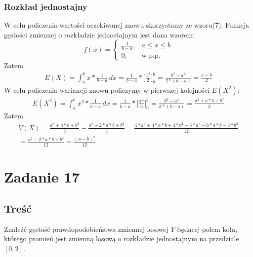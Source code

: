 \documentclass[10pt, a4paper]{article}
\begin{document}
\subsubsection*{Rozkład jednostajny}
W celu policzenia wartości oczekiwanej znowu skorzystamy ze wzoru(7). Funkcja gęstości zmiennej o rozkładzie jednostajnym jest dana wzorem:
\begin{equation}
f(x) = \begin{cases}
       \frac{1}{b-a}, & a \leq x \leq b\\
        0, & \text{w\ p.p.}
  		\end{cases}
\end{equation}
Zatem
\begin{align*}
E(X) = \int_{a}^{b} x * \frac{1}{b-a} \,dx = \frac{1}{b-a} * \Big[ \frac{x^2}{2}\Big]_a^{b} = \frac{b^2 - a^2}{2 * (b - a)} = \frac{a + b}{2}
\end{align*}
W celu policzenia wariancji znowu policzymy w pierwszej kolejności $E(X^2)$:
\begin{align*}
E(X^2) = \int_{a}^{b} x^2 * \frac{1}{b-a} \,dx = \frac{1}{b-a} * \Big[ \frac{x^3}{3}\Big]_a^{b} = \frac{b^3 - a^3}{3 * (b - a)} = \frac{a^2 + a * b + b^2}{3}
\end{align*}
Zatem
\begin{align*}
V(X) = \frac{a^2 + a * b + b^2}{3} - \frac{a^2 + 2 * a * b + b^2}{4} = \frac{4 * a^2 + 4 * a * b + 4 * b^2 - 3 * a^2 - 6 * a * b - 3 * b^2}{12} \\ = \frac{a^2 - 2 * a * b + b^2}{12} = \frac{(a - b)^2}{12}
\end{align*}
\section*{Zadanie 17}
\subsection*{Treść}
Znaleźć gęstość prawdopodobieństwa zmiennej losowej $Y$ będącej polem koła, którego promień jest zmienną losową o rozkładzie jednostajnym na przedziale $[0,2]$.
\end{document}
